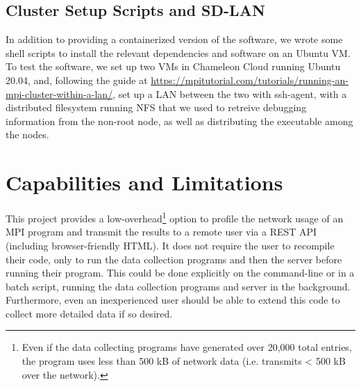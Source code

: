 \documentclass[11pt]{article}
\begin{document}
\subsection*{Cluster Setup Scripts and SD-LAN}
In addition to providing a containerized version of the software, we wrote some shell scripts to install the relevant dependencies and software on an Ubuntu VM. To test the software, we set up two VMs in Chameleon Cloud running Ubuntu 20.04, and, following the guide at \url{https://mpitutorial.com/tutorials/running-an-mpi-cluster-within-a-lan/}, set up a LAN between the two with ssh-agent, with a distributed filesystem running NFS that we used to retreive debugging information from the non-root node, as well as distributing the executable among the nodes.

\section{Capabilities and Limitations}

This project provides a low-overhead\footnote{Even if the data collecting programs have generated over 20,000 total entries, the program uses less than 500 kB of network data (i.e. transmits < 500 kB over the network).} option to profile the network usage of an MPI program and transmit the results to a remote user via a REST API (including browser-friendly HTML). It does not require the user to recompile their code, only to run the data collection programs and then the server before running their program. This could be done explicitly on the command-line or in a batch script, running the data collection programs and server in the background. Furthermore, even an inexperienced user should be able to extend this code to collect more detailed data if so desired.
\end{document}
